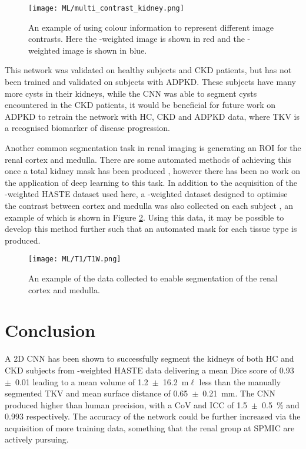 \begin{figure}[H]
	\centering
	\texttt{[image: ML/multi\_contrast\_kidney.png]}
	\caption{An example of using colour information to represent different image contrasts. Here the \ttwo-weighted image is shown in red and the \tone-weighted image is shown in blue.}
	\label{fig:ml_multi_contrast}	
\end{figure}

This network was validated on healthy subjects and \ac{CKD} patients, but has not been trained and validated on subjects with \ac{ADPKD}. These subjects have many more cysts in their kidneys, while the \ac{CNN} was able to segment cysts encountered in the \ac{CKD} patients, it would be beneficial for future work on \ac{ADPKD} to retrain the network with \ac{HC}, \ac{CKD} and \ac{ADPKD} data, where \ac{TKV} is a recognised biomarker of disease progression.

Another common segmentation task in renal imaging is generating an \ac{ROI} for the renal cortex and medulla. There are some automated methods of achieving this once a total kidney mask has been produced \cite{cox_multiparametric_2017, morris_segmentation_2019}, however there has been no work on the application of deep learning to this task. In addition to the acquisition of the \ttwo-weighted \ac{HASTE} dataset used here, a \tone-weighted dataset designed to optimise the contrast between cortex and medulla was also collected on each subject \cite{will_automated_2014}, an example of which is shown in Figure \ref{fig:ml_t1}. Using this data, it may be possible to develop this method further such that an automated mask for each tissue type is produced. 

\begin{figure}[H]
	\centering
	\texttt{[image: ML/T1/T1W.png]}
	\caption{An example of the data collected to enable segmentation of the renal cortex and medulla.}
	\label{fig:ml_t1}
\end{figure}

\newpage

\section{Conclusion}

A 2D \ac{CNN} has been shown to successfully segment the kidneys of both \ac{HC} and \ac{CKD} subjects from \ttwo-weighted \ac{HASTE} data delivering a mean Dice score of 0.93~$\pm$~0.01 leading to a mean volume of 1.2~$\pm$~16.2~m$\ell$ less than the manually segmented \ac{TKV} and mean surface distance of 0.65~$\pm$~0.21~mm. The \ac{CNN} produced higher than human precision, with a \ac{CoV} and \ac{ICC} of 1.5~$\pm$~0.5~\% and 0.993 respectively. The accuracy of the network could be further increased via the acquisition of more training data, something that the renal group at \ac{SPMIC} are actively pursuing. 


